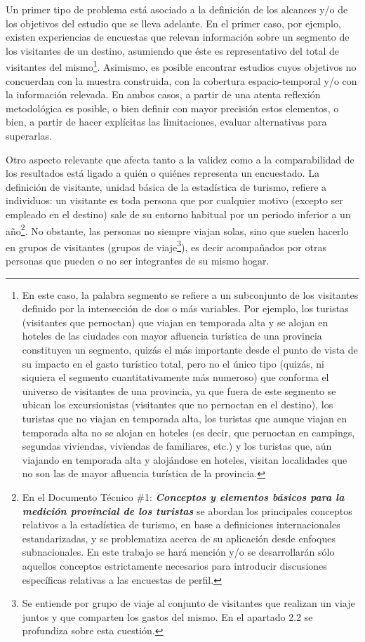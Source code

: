 \documentclass[
]{book}
\begin{document}
Un primer tipo de problema está asociado a la definición de los alcances y/o de los objetivos del estudio que se lleva adelante. En el primer caso, por ejemplo, existen experiencias de encuestas que relevan información sobre un segmento de los visitantes de un destino, asumiendo que éste es representativo del total de visitantes del mismo\footnote{En este caso, la palabra segmento se refiere a un subconjunto de los visitantes definido por la intersección de dos o más variables. Por ejemplo, los turistas (visitantes que pernoctan) que viajan en temporada alta y se alojan en hoteles de las ciudades con mayor afluencia turística de una provincia constituyen un segmento, quizás el más importante desde el punto de vista de su impacto en el gasto turístico total, pero no el único tipo (quizás, ni siquiera el segmento cuantitativamente más numeroso) que conforma el universo de visitantes de una provincia, ya que fuera de este segmento se ubican los excursionistas (visitantes que no pernoctan en el destino), los turistas que no viajan en temporada alta, los turistas que aunque viajan en temporada alta no se alojan en hoteles (es decir, que pernoctan en campings, segundas viviendas, viviendas de familiares, etc.) y los turistas que, aún viajando en temporada alta y alojándose en hoteles, visitan localidades que no son las de mayor afluencia turística de la provincia.}. Asimismo, es posible encontrar estudios cuyos objetivos no concuerdan con la muestra construida, con la cobertura espacio-temporal y/o con la información relevada. En ambos casos, a partir de una atenta reflexión metodológica es posible, o bien definir con mayor precisión estos elementos, o bien, a partir de hacer explícitas las limitaciones, evaluar alternativas para superarlas.

Otro aspecto relevante que afecta tanto a la validez como a la comparabilidad de los resultados está ligado a quién o quiénes representa un encuestado. La definición de visitante, unidad básica de la estadística de turismo, refiere a individuos: un visitante es toda persona que por cualquier motivo (excepto ser empleado en el destino) sale de su entorno habitual por un periodo inferior a un año\footnote{En el Documento Técnico \#1: \textbf{\emph{Conceptos y elementos básicos para la medición provincial de los turistas}} se abordan los principales conceptos relativos a la estadística de turismo, en base a definiciones internacionales estandarizadas, y se problematiza acerca de su aplicación desde enfoques subnacionales. En este trabajo se hará mención y/o se desarrollarán sólo aquellos conceptos estrictamente necesarios para introducir discusiones específicas relativas a las encuestas de perfil.}. No obstante, las personas no siempre viajan solas, sino que suelen hacerlo en grupos de visitantes (grupos de viaje\footnote{Se entiende por grupo de viaje al conjunto de visitantes que realizan un viaje juntos y que comparten los gastos del mismo. En el apartado 2.2 se profundiza sobre esta cuestión.}), es decir acompañados por otras personas que pueden o no ser integrantes de su mismo hogar.
\end{document}
